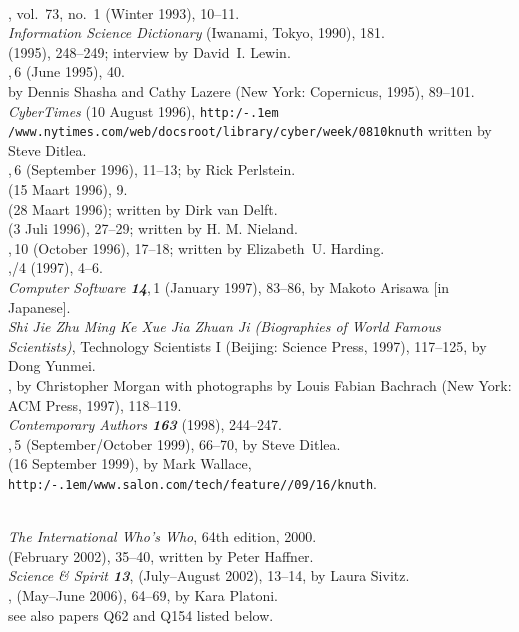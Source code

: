 \\, vol.~73, no.~1 (Winter 1993), 10--11.
\\{\sl Information Science Dictionary\/} (Iwanami, Tokyo, 1990), 181.
\\ (1995), 248--249; interview by
 David~I. Lewin.
\\,\,6 (June 1995), 40.
\\ by Dennis Shasha and Cathy Lazere
 (New York: Copernicus, 1995), 89--101.
\\{\sl CyberTimes\/} (10 August 1996), {\tt http:/\kern-.1em
 /www.nytimes.com/web/docsroot/library/cyber/week/0810knuth\kern-1.5pt\null}
 written by Steve Ditlea.
\\,\,6 (September 1996), 11--13; by
 Rick Perlstein.
\\ (15 Maart 1996), 9.
\\ (28 Maart 1996); written by Dirk van Delft.
\\ (3 Juli 1996), 27--29; written by H. M. Nieland.
\\,\,10 (October 1996),
 17--18; written by Elizabeth~U. Harding.
\\,/4 (1997), 4--6.
\\{\sl Computer Software\/ \bf14},\,1 (January 1997), 83--86, by Makoto
 Arisawa [in Japanese].
\\{\sl Shi Jie Zhu Ming Ke Xue Jia Zhuan Ji (Biographies of World Famous
 Scientists)}, Technology Scientists I (Beijing: Science Press, 1997),
 117--125, by Dong Yunmei.
\\, by Christopher Morgan with photographs
 by Louis Fabian Bachrach (New York: ACM Press, 1997), 118--119.
\\{\sl Contemporary Authors\/ \bf163} (1998), 244--247.
\\,\,5 (September/October 1999), 66--70, 
 by Steve Ditlea.
\\ (16 September 1999), by Mark Wallace,
 {\tt http:/\kern-.1em/www.salon.com/tech/feature//09/16/knuth}.
\par\nobreak
\\{\sl The International Who's Who}, 64th edition, 2000.
\\ (February 2002), 35--40, written by Peter Haffner.
\\{\sl Science \& Spirit\/ \bf13}, (July--August 2002), 13--14,
 by Laura Sivitz.
\\, (May--June 2006), 64--69,
 by Kara Platoni.
\\\star see also papers Q62 and Q154 listed below.
\finishpage

